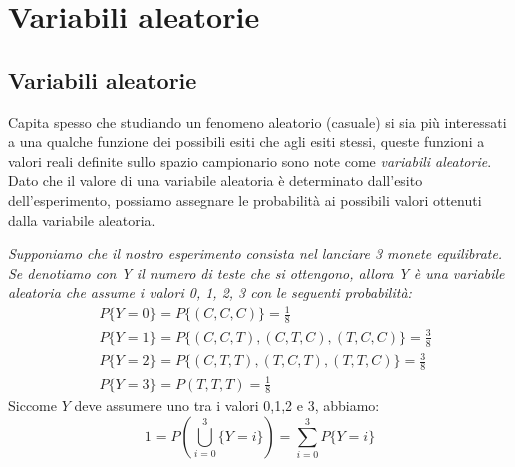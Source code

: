 \chapter{Variabili aleatorie}
\section{Variabili aleatorie}
Capita spesso che studiando un fenomeno aleatorio (casuale) si sia più interessati a una qualche funzione dei possibili esiti che agli esiti stessi, queste funzioni a valori reali definite sullo spazio campionario sono note come \textit{variabili aleatorie}. Dato che il valore di una variabile aleatoria è determinato dall'esito dell'esperimento, possiamo assegnare le probabilità ai possibili valori ottenuti dalla variabile aleatoria.

\begin{Example}{}{}
    \textit{Supponiamo che il nostro esperimento consista nel lanciare 3 monete equilibrate. Se denotiamo con Y il numero di teste che si ottengono, allora Y è una variabile aleatoria che assume i valori 0, 1, 2, 3 con le seguenti probabilità:}
    \begin{align*}
        &P\{Y = 0\} = P\{(C,C,C)\}=\frac{1}{8}\\
        &P\{Y = 1\} = P\{(C, C, T), (C, T, C), (T, C, C)\} = \frac{3}{8}\\
        &P\{Y = 2\} = P\{(C,T,T),(T,C ,T),(T,T,C)\} = \frac{3}{8}\\
        &P\{Y = 3\} =P{(T,T,T)} = \frac{1}{8}
    \end{align*}
    Siccome $Y$ deve assumere uno tra i valori 0,1,2 e 3, abbiamo:
    \begin{equation*}
        1=P(\bigcup^3_{i=0}\{Y=i\})=\sum^3_{i=0}P\{Y=i\}
    \end{equation*}
\end{Example}

